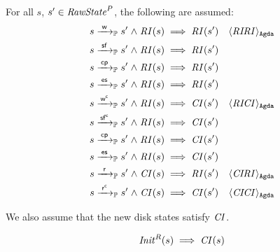 \begin{assumption}
For all $s$, $s' \in \mathit{RawState}^P$, the following are assumed:
\begin{align*}
s \ttP{\awa{\actw}{\actw }} s' \conj \i{RI}(s) &\implies \i{RI}(s') & \AgdaId{\id{RIRI}} \\
s \ttP{\awa{\actw}{\actf }} s' \conj \i{RI}(s) &\implies \i{RI}(s')\\
s \ttP{\awa{\actw}{\actcp}} s' \conj \i{RI}(s) &\implies \i{RI}(s')\\
s \ttP{\awa{\actw}{\actes}} s' \conj \i{RI}(s) &\implies \i{RI}(s')\\
s \ttP{\awa{\actw}{\actwc}} s' \conj \i{RI}(s) &\implies \i{CI}(s') & \AgdaId{\id{RICI}} \\
s \ttP{\awa{\actw}{\actfc}} s' \conj \i{RI}(s) &\implies \i{CI}(s')\\
s \ttP{\awa{\actw}{\actcp}} s' \conj \i{RI}(s) &\implies \i{CI}(s')\\
s \ttP{\awa{\actw}{\actes}} s' \conj \i{RI}(s) &\implies \i{CI}(s')\\
s \ttP{\awa{\actw}{\actr }} s' \conj \i{CI}(s) &\implies \i{RI}(s') & \AgdaId{\id{CIRI}} \\
s \ttP{\awa{\actw}{\actrc}} s' \conj \i{CI}(s) &\implies \i{CI}(s') & \AgdaId{\id{CICI}}
\end{align*}
\end{assumption}

We also assume that the new disk states satisfy $\mathit{CI}$.

\begin{assumption}
\[ \mathit{Init}^R(s) \implies \mathit{CI}(s) \]
\end{assumption}

